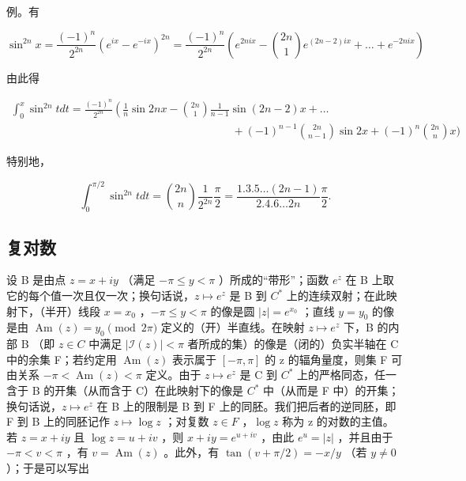 例。有

\[
\sin^ {2 n} x = \frac {(- 1) ^ {n}}{2 ^ {2 n}} \left(e ^ {i x} - e ^ {- i x}\right) ^ {2 n} = \frac {(- 1) ^ {n}}{2 ^ {2 n}} \left(e ^ {2 n i x} - \binom {2 n} {1} e ^ {(2 n - 2) i x} + \dots + e ^ {- 2 n i x}\right)
\]

由此得

\[
\begin{array}{l} \int_ {0} ^ {x} \sin^ {2 n} t d t = \frac {(- 1) ^ {n}}{2 ^ {2 n}} \left(\frac {1}{n} \sin 2 n x - \binom {2 n} {1} \frac {1}{n - 1} \sin (2 n - 2) x + \dots \right. \\ \qquad \qquad \qquad \qquad \qquad \qquad \qquad \qquad \qquad \qquad + (- 1) ^ {n - 1} \binom {2 n} {n - 1} \sin 2 x + (- 1) ^ {n} \binom {2 n} {n} x \Bigg) \end{array}
\]

特别地，

\[
\int_ {0} ^ {\pi / 2} \sin^ {2 n} t   d t = \binom {2 n} {n} \frac {1}{2 ^ {2 n}}   \frac {\pi}{2} = \frac {1 . 3 . 5 \ldots (2 n - 1)}{2 . 4 . 6 \ldots 2 n}   \frac {\pi}{2}.\tag{29}
\]

\subsection{复对数}

设 B 是由点 \(z = x + iy\) （满足 \(-\pi \leqslant y < \pi\) ）所成的“带形”；函数 \(e^{z}\) 在 B 上取它的每个值一次且仅一次；换句话说，\(z \mapsto e^{z}\) 是 B 到 \(C^{*}\) 上的连续双射；在此映射下，（半开）线段 \(x = x_{0}\) ，\(-\pi \leqslant y < \pi\) 的像是圆 \(|z| = e^{x_{0}}\) ；直线 \(y = y_{0}\) 的像是由 \(\operatorname{Am}(z) = y_{0} \pmod{2\pi}\) 定义的（开）半直线。在映射 \(z \mapsto e^{z}\) 下，B 的内部 B （即 \(z \in C\) 中满足 \(|\mathcal{I}(z)| < \pi\) 者所成的集）的像是（闭的）负实半轴在 C 中的余集 F；若约定用 \(\operatorname{Am}(z)\) 表示属于 \([-\pi, \pi]\) 的 z 的辐角量度，则集 F 可由关系 \(-\pi < \operatorname{Am}(z) < \pi\) 定义。由于 \(z \mapsto e^{z}\) 是 C 到 \(C^{*}\) 上的严格同态，任一含于 B 的开集（从而含于 C）在此映射下的像是 \(C^{*}\) 中（从而是 F 中）的开集；换句话说，\(z \mapsto e^{z}\) 在 B 上的限制是 B 到 F 上的同胚。我们把后者的逆同胚，即 F 到 B 上的同胚记作 \(z \mapsto \log z\) ；对复数 \(z \in F\) ，\(\log z\) 称为 z 的对数的主值。若 \(z = x + iy\) 且 \(\log z = u + iv\) ，则 \(x + iy = e^{u + iv}\) ，由此 \(e^{u} = |z|\) ，并且由于 \(-\pi < v < \pi\) ，有 \(v = \operatorname{Am}(z)\) 。此外，有 \(\tan(v + \pi/2) = -x/y\) （若 \(y \neq 0\) ）；于是可以写出

